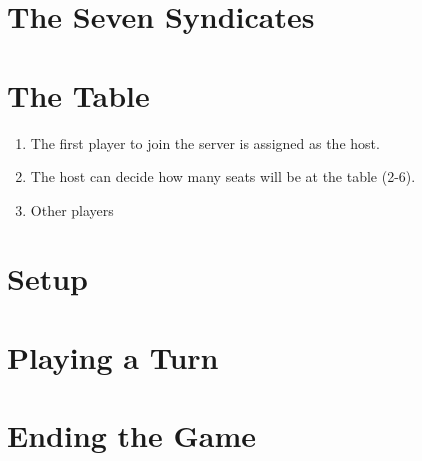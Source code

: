 \documentclass[11pt,letterpaper]{article}
\begin{document}
\section{The Seven Syndicates}


\section{The Table}
\begin{enumerate}
  \item The first player to join the server is assigned as the host.
  \item The host can decide how many seats will be at the table (2-6).
  \item Other players
\end{enumerate}

\section{Setup}


\section{Playing a Turn}


\section{Ending the Game}


\end{document}
